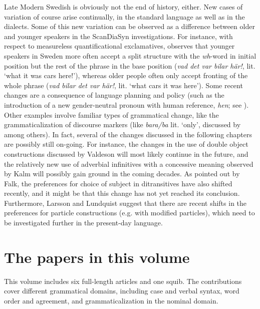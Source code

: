 \documentclass[output=paper]{langscibook}
\begin{document}
Late Modern Swedish is obviously not the end of history, either. New cases of variation of course arise continually, in the standard language as well as in the dialects. Some of this new variation can be observed as a difference between older and younger speakers in the ScanDiaSyn investigations. For instance, with respect to measureless quantificational exclamatives, \citet{Vangsnes2014} observes that younger speakers in Sweden more often accept a split structure with the \textit{wh}{}-word in initial position but the rest of the phrase in the base position (\textit{vad det var bilar här!}, lit. ‘what it was cars here!’), whereas older people often only accept fronting of the whole phrase (\textit{vad bilar det var här!}, lit. ‘what cars it was here’). Some recent changes are a consequence of language planning and policy (such as the introduction of a new gender-neutral pronoun with human reference, \textit{hen}; see \citealt{LedinLyngfelt2013}). Other examples involve familiar types of grammatical change, like the grammaticalization of discourse markers (like \textit{bara/ba} lit. ‘only’, discussed by \citealt{Eriksson1995} among others). In fact, several of the changes discussed in the following chapters are possibly still on-going. For instance, the changes in the use of double object constructions discussed by Valdeson will most likely continue in the future, and the relatively new use of adverbial infinitives with a concessive meaning observed by Kalm will possibly gain ground in the coming decades. As pointed out by Falk, the preferences for choice of subject in ditransitives have also shifted recently, and it might be that this change has not yet reached its conclusion. Furthermore, Larsson and Lundquist suggest that there are recent shifts in the preferences for particle constructions (e.g. with modified particles), which need to be investigated further in the present-day language.

\section{The papers in this volume}\label{sec:intro:4}


This volume includes six full-length articles and one squib. The contributions cover different grammatical domains, including case and verbal syntax, word order and agreement, and grammaticalization in the nominal domain. 
\end{document}
